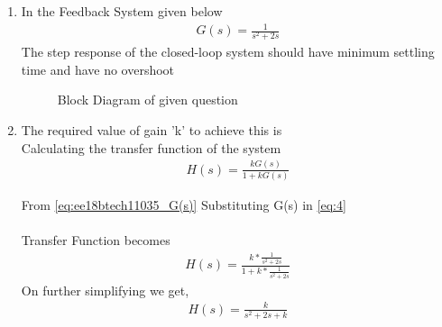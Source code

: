 \begin{enumerate}[label=\thesection.\arabic*.,ref=\thesection.\theenumi]

\item
In the Feedback System given below 
\begin{align}
\label{eq:ee18btech11035_G(s)}
 G(s)=\frac{1}{s^2+2s}
\end{align}
The step response of the closed-loop system should have minimum settling time and have no overshoot\\

\begin{figure}[!ht]
    \begin{center}
		
		\resizebox{\columnwidth}{!}{}
	\end{center}
\caption{Block Diagram of given question}
\label{fig:block2}
\end{figure}

\item The required value of gain 'k' to achieve this is\\
\solution Calculating the transfer function of the system\\
\begin{align}
H(s) = \frac{kG(s)}{1+kG(s)}
\label{eq:4}
\end{align}

From \eqref{eq:ee18btech11035_G(s)} Substituting G(s) in \eqref{eq:4} \\
\\Transfer Function becomes 
\begin{align}
H(s) = \frac{k*\frac{1}{s^2+2s}}{1+k*\frac{1}{s^2+2s}}
\end{align}
On further simplifying we get,\\
\begin{align}
H(s) = \frac{k}{s^2+2s+k}
\label{eq:H(s)}
\end{align}\\


\end{enumerate}
